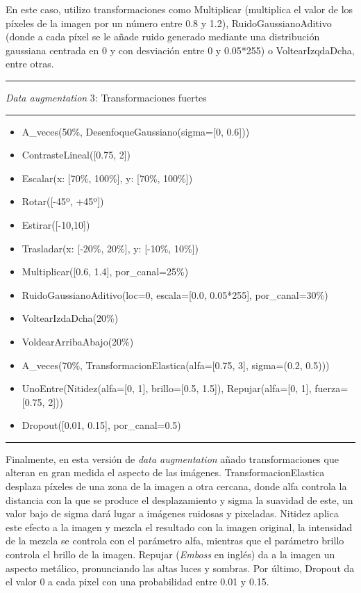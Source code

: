 En este caso, utilizo transformaciones como Multiplicar (multiplica el valor de los píxeles de la imagen por un número entre 0.8 y 1.2), RuidoGaussianoAditivo (donde a cada píxel se le añade ruido generado mediante una distribución gaussiana centrada en 0 y con desviación entre 0 y 0.05*255) o VoltearIzqdaDcha, entre otras.

\noindent\rule{\textwidth}{1pt}
\noindent\textit{Data augmentation} 3: Transformaciones fuertes
\vspace{-0.2cm}
\\\noindent\rule{\textwidth}{1pt}
\begin{itemize}
    \item A\_veces(50\%, DesenfoqueGaussiano(sigma=[0, 0.6]))
    \item ContrasteLineal([0.75, 2])
    \item Escalar(x: [70\%, 100\%], y: [70\%, 100\%])
    \item Rotar([-45º, +45º])
    \item Estirar([-10,10])
    \item Trasladar(x: [-20\%, 20\%], y: [-10\%, 10\%])
    \item Multiplicar([0.6, 1.4], por\_canal=25\%)
    \item RuidoGaussianoAditivo(loc=0, escala=[0.0, 0.05*255], por\_canal=30\%)
    \item VoltearIzdaDcha(20\%)
    \item VoldearArribaAbajo(20\%)
    \item A\_veces(70\%, TransformacionElastica(alfa=[0.75, 3], sigma=(0.2, 0.5)))
    \item UnoEntre(Nitidez(alfa=[0, 1], brillo=[0.5, 1.5]), Repujar(alfa=[0, 1], fuerza=[0.75, 2]))
    \item Dropout([0.01, 0.15], por\_canal=0.5)
\end{itemize}
\vspace{-0.3cm}
\noindent\rule{\textwidth}{1pt}


Finalmente, en esta versión de \textit{data augmentation} añado transformaciones que alteran en gran medida el aspecto de las imágenes. TransformacionElastica desplaza píxeles de una zona de la imagen a otra cercana, donde alfa controla la distancia con la que se produce el desplazamiento y sigma la suavidad de este, un valor bajo de sigma dará lugar a imágenes ruidosas y pixeladas. Nitidez aplica este efecto a la imagen y mezcla el resultado con la imagen original, la intensidad de la mezcla se controla con el parámetro alfa, mientras que el parámetro brillo controla el brillo de la imagen. Repujar (\textit{Emboss} en inglés) da a la imagen un aspecto metálico, pronunciando las altas luces y sombras. Por último, Dropout da el valor 0 a cada pixel con una probabilidad entre 0.01 y 0.15. 


